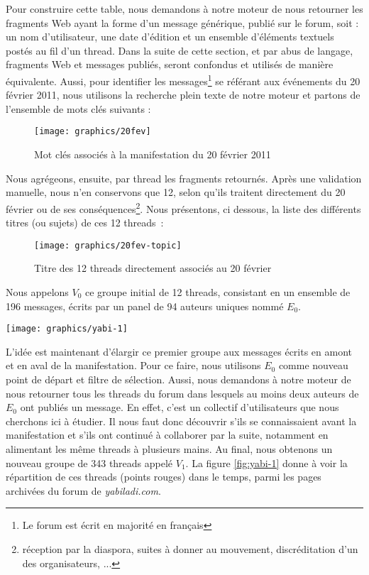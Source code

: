 \documentclass[symmetric,justified,marginals=raggedouter]{tufte-book}
\begin{document}
\noindent Pour construire cette table, nous demandons à notre moteur de nous retourner les fragments Web ayant la forme d'un message générique, publié sur le forum, soit : un nom d'utilisateur, une date d'édition et un ensemble d'éléments textuels postés au fil d'un thread. Dans la suite de cette section, et par abus de langage, fragments Web et messages publiés, seront confondus et utilisés de manière équivalente. Aussi, pour identifier les messages\footnote{Le forum est écrit en majorité en français} se référant aux événements du 20 février 2011, nous utilisons la recherche plein texte de notre moteur et partons de l'ensemble de mots clés suivants :

\begin{figure}
  \texttt{[image: graphics/20fev]}
  \caption{Mot clés associés à la manifestation du 20 février 2011}
  \label{fig:mot}
\end{figure}  

\noindent Nous agrégeons, ensuite, par thread les fragments retournés. Après une validation manuelle, nous n'en conservons que 12, selon qu'ils traitent directement du 20 février ou de ses conséquences\footnote{réception par la diaspora, suites à donner au mouvement, discréditation d'un des organisateurs, ...}. Nous présentons, ci dessous, la liste des différents titres (ou sujets) de ces 12 threads~:

\begin{figure}
  \texttt{[image: graphics/20fev-topic]}
  \caption{Titre des 12 threads directement associés au 20 février}
  \label{fig:20fevTopic}
\end{figure}  

\noindent Nous appelons $V_0$ ce groupe initial de 12 threads, consistant en un ensemble de 196 messages, écrits par un panel de 94 auteurs uniques nommé $E_0$.

\begin{figure*}[hbtp]%
  \texttt{[image: graphics/yabi-1]}
  \caption{Évolution de la structure de \textit{yabiladi.com} et ensemble de threads $V_1$}
  \label{fig:yabi-1}
\end{figure*}

\noindent L'idée est maintenant d'élargir ce premier groupe aux messages écrits en amont et en aval de la manifestation. Pour ce faire, nous utilisons $E_0$ comme nouveau point de départ et filtre de sélection. Aussi, nous demandons à notre moteur de nous retourner tous les threads du forum dans lesquels au moins deux auteurs de $E_0$ ont publiés un message. En effet, c'est un collectif d'utilisateurs que nous cherchons ici à étudier. Il nous faut donc découvrir s'ils se connaissaient avant la manifestation et s'ils ont continué à collaborer par la suite, notamment en alimentant les même threads à plusieurs mains. Au final, nous obtenons un nouveau groupe de 343 threads appelé $V_1$. La figure \ref{fig:yabi-1} donne à voir la répartition de ces threads (points rouges) dans le temps, parmi les pages archivées du forum de \textit{yabiladi.com}.
\end{document}
